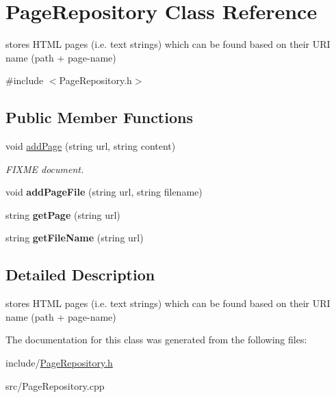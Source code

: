\hypertarget{classPageRepository}{}\section{Page\+Repository Class Reference}
\label{classPageRepository}


stores H\+T\+ML pages (i.\+e. text strings) which can be found based on their U\+RI name (path + page-\/name)  




{\ttfamily \#include $<$Page\+Repository.\+h$>$}

\subsection*{Public Member Functions}
\begin{DoxyCompactItemize}
\item 
\mbox{\label{classPageRepository_a3ba320211d1c61641a1105bb46322b3d}} 
void \hyperlink{classPageRepository_a3ba320211d1c61641a1105bb46322b3d}{add\+Page} (string url, string content)
\begin{DoxyCompactList}\small\item\em F\+I\+X\+ME document. \end{DoxyCompactList}\item 
\mbox{\label{classPageRepository_a908993cca7ed7b8df0833d2fba444d14}} 
void {\bfseries add\+Page\+File} (string url, string filename)
\item 
\mbox{\label{classPageRepository_a6731593d95cea84cf705d8ce6672c869}} 
string {\bfseries get\+Page} (string url)
\item 
\mbox{\label{classPageRepository_a4b59ed8a349dba67089ff8babecd324b}} 
string {\bfseries get\+File\+Name} (string url)
\end{DoxyCompactItemize}


\subsection{Detailed Description}
stores H\+T\+ML pages (i.\+e. text strings) which can be found based on their U\+RI name (path + page-\/name) 

The documentation for this class was generated from the following files\+:\begin{DoxyCompactItemize}
\item 
include/\hyperlink{PageRepository_8h}{Page\+Repository.\+h}\item 
src/Page\+Repository.\+cpp\end{DoxyCompactItemize}
